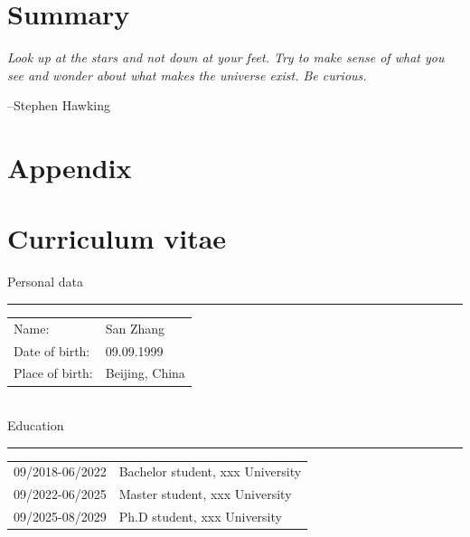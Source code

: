 \documentclass[12pt,openright]{book}
\begin{document}
\chapter{Summary}
\null
\vfill

\noindent \Large{\textit{Look up at the stars and not down at your feet. Try to make sense of what you see and wonder about what makes the universe exist. Be curious.}}

\hfill \large{--Stephen Hawking}

\vspace{25mm} %

\chapter*{Appendix}

{}


\listoffigures

\listoftables

\chapter*{Curriculum vitae}

\noindent Personal data

\noindent\rule{\textwidth}{0.4pt}

\vskip 0.1in

\begin{tabular}{p{}p{}}
  Name: & San Zhang \\
  Date of birth: & 09.09.1999 \\
  Place of birth: & Beijing, China \\
\end{tabular} \\

\noindent Education

\noindent\rule{\textwidth}{0.4pt}

\vskip 0.1in

\begin{tabular}{p{}p{}}
  09/2018-06/2022 & Bachelor student, xxx University \\
  09/2022-06/2025 & Master student, xxx University \\
  09/2025-08/2029 & Ph.D student, xxx University \\
\end{tabular} \\
\end{document}
